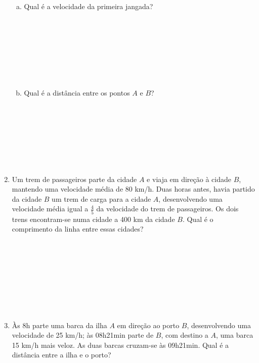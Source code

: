 \documentclass[a4paper,14pt]{article}
\begin{document}
\begin{multicols}{2}
\begin{enumerate}
    	    \begin{enumerate}[a)]
    	    	\item Qual é a velocidade da primeira jangada? \\\\\\\\\\\\\\\\
    	    	\item Qual é a distância entre os pontos $A$ e $B$? \\\\\\\\\\\\\\\\
    	    \end{enumerate}
            \item Um trem de passageiros parte da cidade $A$ e viaja em direção à cidade $B$, mantendo uma velocidade média de 80 km/h. Duas horas antes, havia partido da cidade $B$ um trem de carga para a cidade $A$, desenvolvendo uma velocidade média igual a $\frac{4}{5}$ da velocidade do trem de passageiros. Os dois trens encontram-se numa cidade a 400 km da cidade $B$. Qual é o comprimento da linha entre essas cidades? \\\\\\\\\\\\\\\\\\
            \item Às 8h parte uma barca da ilha $A$ em direção ao porto $B$, desenvolvendo uma velocidade de 25 km/h; às 08h21min parte de $B$, com destino a $A$, uma barca 15 km/h mais veloz. As duas barcas cruzam-se às 09h21min. Qual é a distância entre a ilha e o porto? \\\\\\\\\\\\\\\\\\\\

\end{enumerate}
\end{multicols}
\end{document}
